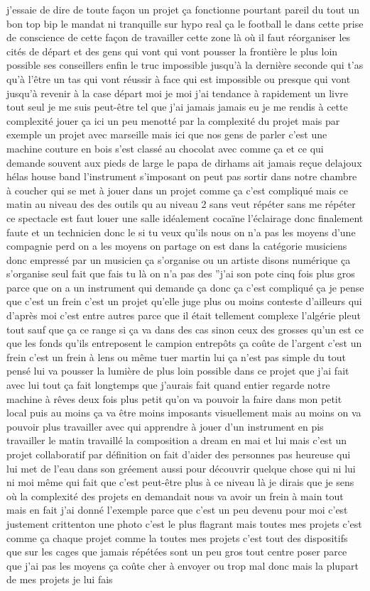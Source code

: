 j'essaie de dire de toute façon un projet ça fonctionne pourtant pareil du tout un bon top bip le mandat ni tranquille sur hypo real ça le football le dans cette prise de conscience de cette façon de travailler cette zone là où il faut réorganiser les cités de départ et des gens qui vont qui vont pousser la frontière le plus loin possible ses conseillers enfin le truc impossible jusqu'à la dernière seconde qui t'as qu'à l'être un tas qui vont réussir à face qui est impossible ou presque qui vont jusqu'à revenir à la case départ moi je moi j'ai tendance à rapidement un livre tout seul je me suis peut-être tel que j'ai jamais jamais eu je me rendis à cette complexité jouer ça ici un peu menotté par la complexité du projet mais par exemple un projet avec marseille mais ici que nos gens de parler c'est une machine couture en bois s'est classé au chocolat avec comme ça et ce qui demande souvent aux pieds de large le papa de dirhams ait jamais reçue delajoux hélas house band l'instrument s'imposant on peut pas sortir dans notre chambre à coucher qui se met à jouer dans un projet comme ça c'est compliqué mais ce matin au niveau des des outils qu au niveau 2 sans veut répéter sans me répéter ce spectacle est faut louer une salle idéalement cocaïne l'éclairage donc finalement faute et un technicien donc le si tu veux qu'ils nous on n'a pas les moyens d'une compagnie perd on a les moyens on partage on est dans la catégorie musiciens donc empressé par un musicien ça s'organise ou un artiste disons numérique ça s'organise seul fait que fais tu là on n'a pas des ''j'ai son pote cinq fois plus gros parce que on a un instrument qui demande ça donc ça c'est compliqué ça je pense que c'est un frein c'est un projet qu'elle juge plus ou moins conteste d'ailleurs qui d'après moi c'est entre autres parce que il était tellement complexe l'algérie pleut tout sauf que ça ce range si ça va dans des cas sinon ceux des grosses qu'un est ce que les fonds qu'ils entreposent le campion entrepôts ça coûte de l'argent c'est un frein c'est un frein à lens ou même tuer martin lui ça n'est pas simple du tout pensé lui va pousser la lumière de plus loin possible dans ce projet que j'ai fait avec lui tout ça fait longtemps que j'aurais fait quand entier regarde notre machine à rêves deux fois plus petit qu'on va pouvoir la faire dans mon petit local puis au moins ça va être moins imposants visuellement mais au moins on va pouvoir plus travailler avec qui apprendre à jouer d'un instrument en pis travailler le matin travaillé la composition a dream en mai et lui mais c'est un projet collaboratif par définition on fait d'aider des personnes pas heureuse qui lui met de l'eau dans son gréement aussi pour découvrir quelque chose qui ni lui ni moi même qui fait que c'est peut-être plus à ce niveau là je dirais que je sens où la complexité des projets en demandait nous va avoir un frein à main tout mais en fait j'ai donné l'exemple parce que c'est un peu devenu pour moi c'est justement crittenton une photo c'est le plus flagrant mais toutes mes projets c'est comme ça chaque projet comme la toutes mes projets c'est tout des dispositifs que sur les cages que jamais répétées sont un peu gros tout centre poser parce que j'ai pas les moyens ça coûte cher à envoyer ou trop mal donc mais la plupart de mes projets je lui fais 